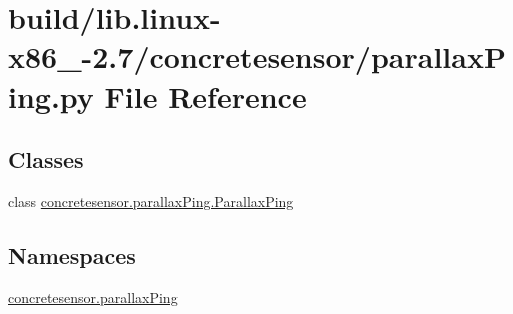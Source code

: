 \hypertarget{build_2lib_8linux-x86__64-2_87_2concretesensor_2parallaxPing_8py}{}\section{build/lib.linux-\/x86\+\_-\/2.7/concretesensor/parallax\+Ping.py File Reference}
\label{build_2lib_8linux-x86__64-2_87_2concretesensor_2parallaxPing_8py}
\subsection*{Classes}
\begin{DoxyCompactItemize}
\item 
class \hyperlink{classconcretesensor_1_1parallaxPing_1_1ParallaxPing}{concretesensor.\+parallax\+Ping.\+Parallax\+Ping}
\end{DoxyCompactItemize}
\subsection*{Namespaces}
\begin{DoxyCompactItemize}
\item 
 \hyperlink{namespaceconcretesensor_1_1parallaxPing}{concretesensor.\+parallax\+Ping}
\end{DoxyCompactItemize}

